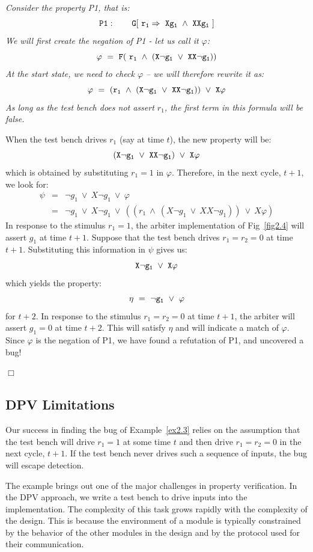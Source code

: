 \begin{example} \label{ex2.3}
{\em Consider the property P1, that is:
\[ {\tt P1: \qquad G[\ r_1 \Rightarrow\  Xg_1\ \land\  XXg_1\ ]}  \]
We will first create the negation of P1 - let us call it $\varphi$:
\[{\tt \varphi\ =\ F(\ r_1\ \land\ (X \neg g_1\ \lor\ XX \neg g_1))} \]
At the start state, we need to check $\varphi$ -- we will therefore rewrite
it as: 
\[{\tt \varphi\ =\ (r_1\ \land\ (X \neg g_1\ \lor\ XX \neg g_1))\ 
	\lor\ X\varphi} \]
As long as the test bench does not assert $r_1$, the first term in this
formula will be false.

\noindent
When the test bench drives $r_1$ (say at time $t$), the new property will be:
\[ {\tt (X \neg g_1\ \lor\ XX \neg g_1)\ \lor\ X\varphi} \]
which is obtained by substituting $r_1 = 1$ in $\varphi$. Therefore, in the
next cycle, $t+1$, we look for:
\begin{eqnarray*}
\psi & = & \neg g_1\ \lor\ X \neg g_1\ \lor\ \varphi \\
     & = & \neg g_1\ \lor\ X \neg g_1\ \lor\
    ((r_1\ \land\ (X \neg g_1\ \lor\ XX \neg g_1))\ \lor\ X\varphi)
\end{eqnarray*}
\noindent
In response to the stimulus $r_1 = 1$, the arbiter implementation of
Fig~\ref{fig2.4} will assert $g_1$ at time $t+1$. Suppose that the test 
bench drives $r_1 = r_2 = 0$ at time $t+1$. Substituting this
information in $\psi$ gives us:
\[ {\tt X \neg g_1\ \lor\ X\varphi} \]
which yields the property:
\[ {\tt \eta\ =\ \neg g_1\ \lor\ \varphi} \]
for $t+2$. In response to the stimulus
$r_1 = r_2 = 0$ at time $t+1$, the arbiter will assert $g_1 = 0$ at time
$t+2$. This will satisfy $\eta$ and will indicate a match of $\varphi$.
Since $\varphi$ is the negation of P1, we have found a refutation of P1,
and uncovered a bug!} $\Box$
\end{example} 

\subsection{DPV Limitations}
\noindent
Our success in finding the bug of Example~\ref{ex2.3} relies on the
assumption that the test bench will drive $r_1 = 1$ at some time $t$ and
then drive $r_1 = r_2 = 0$ in the next cycle, $t+1$. If the test bench
never drives such a sequence of inputs, the bug will escape detection.

\noindent
The example brings out one of the major challenges in property verification.
In the DPV approach, we write a test bench to drive inputs
into the implementation. The complexity of this task grows rapidly with the
complexity of the design. This is because the environment of a module is
typically constrained by the behavior of the other modules in the design
and by the protocol used for their communication.  

